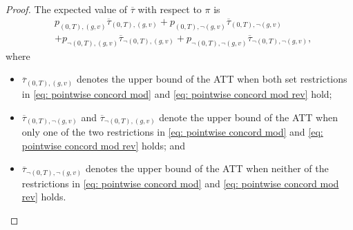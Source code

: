 \documentclass[twoside,11pt]{article}
\begin{document}
\begin{proof}

The expected value of $\overline{\tau}$ with respect to $\pi$ is
\begin{equation} \label{eq: ATT dist I}
\begin{split}
& p_{(0,T),(g,v)} \overline{\tau}_{(0,T),(g,v)} + p_{(0,T),\neg(g,v)} \overline{\tau}_{(0,T),\neg(g,v)} \\ 
& + p_{\neg(0,T),(g,v)} \overline{\tau}_{\neg(0,T),(g,v)} + p_{\neg(0,T),\neg(g,v)} \overline{\tau}_{\neg(0,T),\neg(g,v)},
\end{split}
\end{equation}
where
\begin{itemize}
\item $\overline{\tau}_{(0,T),(g,v)}$ denotes the upper bound of the \textrm{ATT} when both set restrictions in \eqref{eq: pointwise concord mod} and \eqref{eq: pointwise concord mod rev} hold;
\item $\overline{\tau}_{(0,T),\neg(g,v)}$ and $\overline{\tau}_{\neg(0,T),(g,v)}$ denote the upper bound of the \textrm{ATT} when only one of the two restrictions in \eqref{eq: pointwise concord mod} and \eqref{eq: pointwise concord mod rev} holds; and
\item $\overline{\tau}_{\neg(0,T),\neg(g,v)}$ denotes the upper bound of the \textrm{ATT} when neither of the restrictions in \eqref{eq: pointwise concord mod} and \eqref{eq: pointwise concord mod rev} holds.
\end{itemize}


\end{proof}
\end{document}
